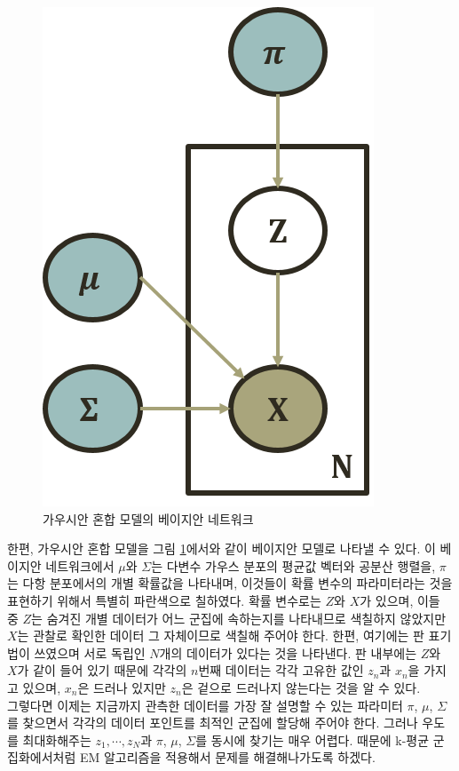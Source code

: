 \documentclass[a4paper]{oblivoir}
\begin{document}
\begin{figure}[ht] \centering 
\includegraphics[scale=0.6]{fig8_10.png} 
\caption{가우시안 혼합 모델의 베이지안 네트워크}
\label{fig:8-10}
\end{figure} 

한편, 가우시안 혼합 모델을 그림 \ref{fig:8-10}에서와 같이 베이지안 모델로 나타낼 수 있다. 이 베이지안 네트워크에서 ${\mu}$와 ${\Sigma}$는 다변수 가우스 분포의 평균값 벡터와 공분산 행렬을, $\pi$는 다항 분포에서의 개별 확률값을 나타내며, 이것들이 확률 변수의 파라미터라는 것을 표현하기 위해서 특별히 파란색으로 칠하였다. 확률 변수로는 $Z$와 $X$가 있으며, 이들 중 $Z$는 숨겨진 개별 데이터가 어느 군집에 속하는지를 나타내므로 색칠하지 않았지만 $X$는 관찰로 확인한 데이터 그 자체이므로 색칠해 주어야 한다. 한편, 여기에는 판 표기법이 쓰였으며 서로 독립인 $N$개의 데이터가 있다는 것을 나타낸다. 판 내부에는 $Z$와 $X$가 같이 들어 있기 때문에 각각의 $n$번째 데이터는 각각 고유한 값인 $z_n$과 $x_n$을 가지고 있으며, $x_n$은 드러나 있지만 $z_n$은 겉으로 드러나지 않는다는 것을 알 수 있다. \\ 

그렇다면 이제는 지금까지 관측한 데이터를 가장 잘 설명할 수 있는 파라미터 $\pi$, $\mu$, $\Sigma$를 찾으면서 각각의 데이터 포인트를 최적인 군집에 할당해 주어야 한다. 그러나 우도를 최대화해주는 $z_1,\cdots,z_N$과 $\pi$, $\mu$, $\Sigma$를 동시에 찾기는 매우 어렵다. 때문에 k-평균 군집화에서처럼 EM 알고리즘을 적용해서 문제를 해결해나가도록 하겠다. \\
\end{document}
